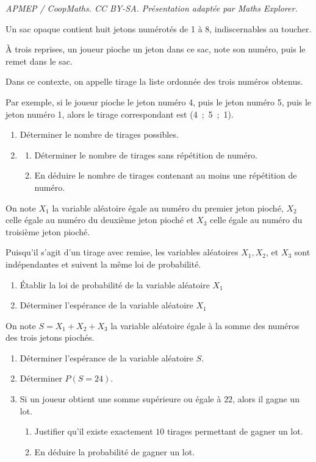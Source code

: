 \documentclass[10pt]{article}
\begin{document}
\noindent\textit{APMEP / CoopMaths. CC BY-SA. Présentation adaptée par Maths Explorer.}\par\medskip
\medskip

Un sac opaque contient huit jetons numérotés de 1 à 8, indiscernables au toucher.

À trois reprises, un joueur pioche un jeton dans ce sac, note son numéro, puis le remet dans le sac.

Dans ce contexte, on appelle \og tirage \fg{} la liste ordonnée des trois numéros obtenus.

Par exemple, si le joueur pioche le jeton numéro 4, puis le jeton numéro 5, puis le jeton numéro 1, alors le tirage correspondant est (4~;~5~;~1).

\medskip

\begin{enumerate}
\item Déterminer le nombre de tirages possibles.
\item 
	\begin{enumerate}
		\item Déterminer le nombre de tirages sans répétition de numéro.
		\item En déduire le nombre de tirages contenant au moins une répétition de numéro.
	\end{enumerate}
\end{enumerate}
	
On note $X_1$ la variable aléatoire égale au numéro du premier jeton pioché, $X_2$ celle égale au numéro du deuxième jeton pioché et $X_3$ celle égale au numéro du troisième jeton pioché.

Puisqu'il s'agit d'un tirage avec remise, les variables aléatoires $X_1, X_2$, et $X_3$ sont indépendantes et suivent la même loi de probabilité.

\begin{enumerate}[resume]
\item Établir la loi de probabilité de la variable aléatoire $X_1$
\item Déterminer l'espérance de la variable aléatoire $X_1$
\end{enumerate}

On note $S = X_1 + X_2 + X_3$ la variable aléatoire égale à la somme des numéros des trois jetons piochés.

\begin{enumerate}[resume]
\item Déterminer l'espérance de la variable aléatoire $S$.
\item Déterminer $P(S = 24)$.
\item Si un joueur obtient une somme supérieure ou égale à $22$, alors il gagne un lot.
	\begin{enumerate}
		\item Justifier qu'il existe exactement $10$ tirages permettant de gagner un lot.
		\item En déduire la probabilité de gagner un lot.
	\end{enumerate}
\end{enumerate}

\medskip
\end{document}
